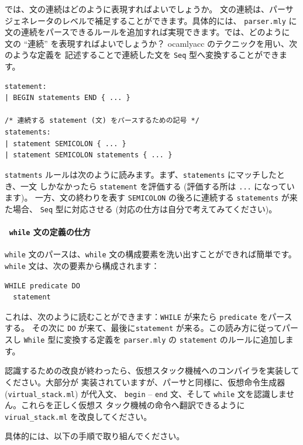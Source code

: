 \documentclass[a4paper,11pt]{jsarticle}
\begin{document}
では、文の連続はどのように表現すればよいでしょうか。
文の連続は、パーサジェネレータのレベルで補足することができます。具体的には、
\verb|parser.mly| に文の連続をパースできるルールを追加すれば実現できます。では、どのように
文の ``連続'' を表現すればよいでしょうか？  ocamlyacc のテクニックを用い、次のような定義を
記述することで連続した文を \verb|Seq| 型へ変換することができます。

\begin{lstlisting}
statement:
| BEGIN statements END { ... }

/* 連続する statement (文) をパースするための記号 */
statements:
| statement SEMICOLON { ... }
| statement SEMICOLON statements { ... }
\end{lstlisting}

\verb|statments| ルールは次のように読みます。まず、\verb|statements| にマッチしたとき、一文
しかなかったら \verb|statement| を評価する (評価する所は \verb|...| になっています)。
一方、文の終わりを表す \verb|SEMICOLON| の後ろに連続する \verb|statements| が来た場合、
\verb|Seq| 型に対応させる (対応の仕方は自分で考えてみてください)。

\paragraph*{\, \texttt{while} 文の定義の仕方}

\verb|while| 文のパースは、\verb|while| 文の構成要素を洗い出すことができれば簡単です。
\verb|while| 文は、次の要素から構成されます：

\begin{lstlisting}
WHILE predicate DO
  statement
\end{lstlisting}

これは、次のように読むことができます：\verb|WHILE| が来たら \verb|predicate| をパースする。
その次に \verb|DO| が来て、最後に\verb|statement| が来る。この読み方に従ってパースし
\verb|While| 型に変換する定義を \verb|parser.mly| の \verb|statement| のルールに追加します。

\noindent{}

認識するための改良が終わったら、仮想スタック機械へのコンパイラを実装してください。大部分が
実装されていますが、パーサと同様に、仮想命令生成器 (\verb|virtual_stack.ml|) が代入文、
\verb|begin| -- \verb|end| 文、そして \verb|while| 文を認識しません。これらを正しく仮想ス
タック機械の命令へ翻訳できるように \verb|virual_stack.ml| を改良してください。

具体的には、以下の手順で取り組んでください。
\end{document}

